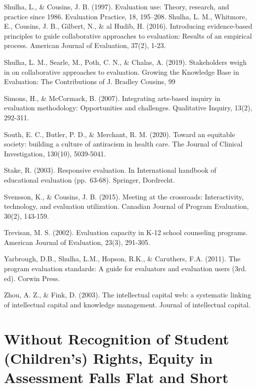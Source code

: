 \documentclass[
]{book}
\begin{document}
Shulha, L., \& Cousins, J. B. (1997). Evaluation use: Theory, research, and practice since 1986. Evaluation Practice, 18, 195--208.
Shulha, L. M., Whitmore, E., Cousins, J. B., Gilbert, N., \& al Hudib, H. (2016). Introducing evidence-based principles to guide collaborative approaches to evaluation: Results of an empirical process. American Journal of Evaluation, 37(2), 1-23.

Shulha, L. M., Searle, M., Poth, C. N., \& Chalas, A. (2019). Stakeholders weigh in on collaborative approaches to evaluation. Growing the Knowledge Base in Evaluation: The Contributions of J. Bradley Cousins, 99

Simons, H., \& McCormack, B. (2007). Integrating arts-based inquiry in evaluation methodology: Opportunities and challenges. Qualitative Inquiry, 13(2), 292-311.

South, E. C., Butler, P. D., \& Merchant, R. M. (2020). Toward an equitable society: building a culture of antiracism in health care. The Journal of Clinical Investigation, 130(10), 5039-5041.

Stake, R. (2003). Responsive evaluation. In International handbook of educational evaluation (pp.~63-68). Springer, Dordrecht.

Svensson, K., \& Cousins, J. B. (2015). Meeting at the crossroads: Interactivity, technology, and evaluation utilization. Canadian Journal of Program Evaluation, 30(2), 143-159.

Trevisan, M. S. (2002). Evaluation capacity in K-12 school counseling programs. American Journal of Evaluation, 23(3), 291-305.

Yarbrough, D.B., Shulha, L.M., Hopson, R.K., \& Caruthers, F.A. (2011). The program evaluation standards: A guide for evaluators and evaluation users (3rd. ed). Corwin Press.

Zhou, A. Z., \& Fink, D. (2003). The intellectual capital web: a systematic linking of intellectual capital and knowledge management. Journal of intellectual capital.

\newpage

\hypertarget{without-recognition-of-student-childrens-rights-equity-in-assessment-falls-flat-and-short}{%
\section{Without Recognition of Student (Children's) Rights, Equity in Assessment Falls Flat and Short}\label{without-recognition-of-student-childrens-rights-equity-in-assessment-falls-flat-and-short}}
\end{document}

